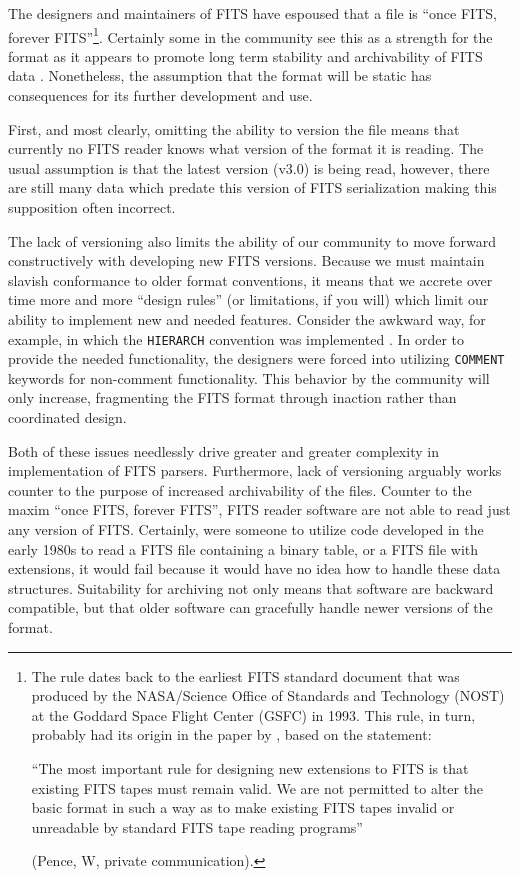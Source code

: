 \documentclass[final,authoryear,5p,times,twocolumn]{elsarticle}
\begin{document}
The designers and maintainers of FITS have espoused that a file is
``once FITS, forever FITS''\footnote{The rule dates back to the earliest
FITS standard document that was produced by the NASA/Science Office
of Standards and Technology (NOST) at the Goddard Space Flight Center
(GSFC) in 1993. This rule, in turn, probably had its origin in the paper
by \citet{1988A&AS...73..359G}, based on the statement:

``The most important rule for designing new extensions to FITS is that
existing FITS tapes must remain valid.  We are not permitted to alter
the basic format in such a way as to make existing FITS tapes invalid
or unreadable by standard FITS tape reading programs''

(Pence, W, private communication).}.
Certainly some in the community see
this as a strength for the format as it appears to promote long term
stability and archivability of FITS data \citep[][US Library of
Congress\footnote{see
\url{http://www.digitalpreservation.gov/formats/fdd/fdd000317.shtml}}]{2012EWASSAlle}.
Nonetheless, the assumption that the format will be static has consequences
for its further development and use.


First, and most clearly, omitting the ability to version the file
means that currently no FITS reader knows what version of the format
it is reading. The usual assumption is that the latest version (v3.0)
is being read, however, there are still many data which predate this
version of FITS serialization making this supposition often incorrect.


The lack of versioning also limits the ability of our community to
move forward constructively with developing new FITS versions. Because
we must maintain slavish conformance to older format conventions, it
means that we accrete over time more and more ``design rules'' (or
limitations, if you will) which limit our ability to implement new and
needed features. Consider the awkward way, for example, in which the
\texttt{HIERARCH} convention was implemented \citep{2009Wic}.
In order to provide the needed functionality, the designers
were forced into utilizing \texttt{COMMENT} keywords for non-comment
functionality. This behavior by the community will only increase,
fragmenting the FITS format through inaction rather than coordinated
design.


Both of these issues needlessly drive greater and greater complexity
in implementation of FITS parsers. Furthermore, lack of versioning
arguably works counter to the purpose of increased archivability of
the files. Counter to the maxim ``once FITS, forever FITS'', FITS reader
software are not able to read just any version of FITS. Certainly,
were someone to utilize code developed in the early 1980s to read a
FITS file containing a binary table, or a FITS file with extensions,
it would fail because it would have no idea how to handle these data
structures. Suitability for archiving not only means that software are
backward compatible, but that older software can gracefully handle
newer versions of the format.
\end{document}
